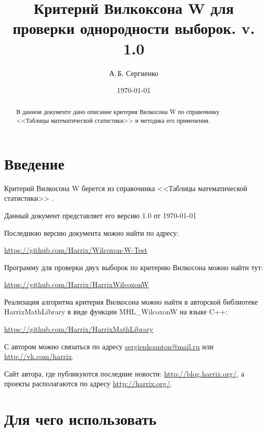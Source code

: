 \documentclass[a4paper,12pt]{article}
\title{Критерий Вилкоксона W для проверки однородности выборок. v. 1.0}
\author{А.\,Б. Сергиенко}
\date{\today}
\begin{document}


\maketitle

\begin{abstract}
В данном документе дано описание критерия Вилкосона W по справочнику <<Таблицы математической статистики>> \cite[с. 93]{book:Bolshev1983} и методика его применения.
\end{abstract}

\tableofcontents

\newpage

\section{Введение}

Критерий Вилкосона W берется из справочника <<Таблицы математической статистики>> \cite[с. 93]{book:Bolshev1983}.

Данный документ представляет его версию 1.0 от \today

Последнюю версию документа можно найти по адресу:

\href{https://github.com/Harrix/Wilcoxon-W-Test}{https://github.com/Harrix/Wilcoxon-W-Test}

Программу для проверки двух выборок по критерию Вилкосона можно найти тут:

\href{https://github.com/Harrix/HarrixWilcoxonW}{https://github.com/Harrix/HarrixWilcoxonW}

Реализация алгоритма критерия Вилкосона можно найти в авторской библиотеке HarrixMathLibrary в виде функции MHL\_WilcoxonW на языке C++:

\href{https://github.com/Harrix/HarrixMathLibrary}{https://github.com/Harrix/HarrixMathLibrary}

С автором можно связаться по адресу \href{mailto:sergienkoanton@mail.ru}{sergienkoanton@mail.ru} или  \href{http://vk.com/harrix}{http://vk.com/harrix}.

Сайт автора, где публикуются последние новости: \href{http://blog.harrix.org/}{http://blog.harrix.org/}, а проекты располагаются по адресу \href{http://harrix.org/}{http://harrix.org/}.

\section{Для чего использовать}
\end{document}
